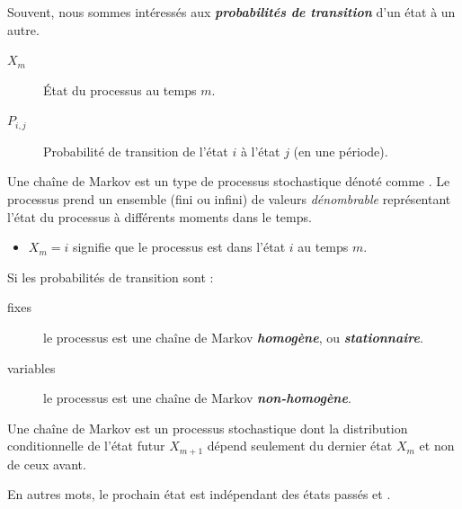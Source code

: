 \documentclass[french]{article}
\begin{document}
\begin{multicols*}{2}
\begin{rappel_enhanced}[Contexte]
\bigskip

Souvent, nous sommes intéressés aux \textit{\textbf{probabilités de transition}} d'un état à un autre. 
\end{rappel_enhanced}

\begin{distributions}[Notation]
\begin{description}
	\item[$X_{m}$]	État du processus au temps $m$.
	\item[$P_{i, j}$]	Probabilité de transition de l'état $i$ à l'état $j$ (en une période).
\end{description}
\end{distributions}

\begin{definitionNOHFILL}
Une chaîne de Markov est un type de processus stochastique dénoté comme . Le processus prend un ensemble (fini ou infini) de valeurs \textit{dénombrable} représentant l'état du processus à différents moments dans le temps.
\begin{itemize}
	\item	$X_{m} = i$ signifie que le processus est dans l'état $i$ au temps $m$.
\end{itemize}
\end{definitionNOHFILL}

\begin{definitionNOHFILLsub}
Si les probabilités de transition sont :
\begin{description}
	\item[fixes]	le processus est une chaîne de Markov \textbf{\textit{homogène}}, ou \textbf{\textit{stationnaire}}.
	\item[variables]	le processus est une chaîne de Markov \textbf{\textit{non-homogène}}.
\end{description}
\end{definitionNOHFILLsub}

\begin{definitionNOHFILLsub}
Une chaîne de Markov est un processus stochastique dont la distribution conditionnelle de l'état futur $X_{m + 1}$ dépend seulement du dernier état $X_{m}$ et non de ceux avant. 

\bigskip

En autres mots, le prochain état est indépendant des états passés et .
\end{definitionNOHFILLsub}


\end{multicols*}
\end{document}
